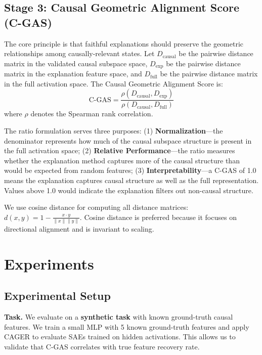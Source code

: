 \documentclass{article}
\begin{document}
\subsection{Stage 3: Causal Geometric Alignment Score (C-GAS)}

The core principle is that faithful explanations should preserve the geometric relationships among causally-relevant states. Let $D_{\text{causal}}$ be the pairwise distance matrix in the validated causal subspace space, $D_{\text{exp}}$ be the pairwise distance matrix in the explanation feature space, and $D_{\text{full}}$ be the pairwise distance matrix in the full activation space. The Causal Geometric Alignment Score is:
\begin{equation}
\text{C-GAS} = \frac{\rho(D_{\text{causal}}, D_{\text{exp}})}{\rho(D_{\text{causal}}, D_{\text{full}})}
\end{equation}
where $\rho$ denotes the Spearman rank correlation.

The ratio formulation serves three purposes: (1) \textbf{Normalization}---the denominator represents how much of the causal subspace structure is present in the full activation space; (2) \textbf{Relative Performance}---the ratio measures whether the explanation method captures more of the causal structure than would be expected from random features; (3) \textbf{Interpretability}---a C-GAS of 1.0 means the explanation captures causal structure as well as the full representation. Values above 1.0 would indicate the explanation filters out non-causal structure.

We use cosine distance for computing all distance matrices: $d(x, y) = 1 - \frac{x \cdot y}{\|x\| \|y\|}$. Cosine distance is preferred because it focuses on directional alignment and is invariant to scaling.

\section{Experiments}

\subsection{Experimental Setup}

\textbf{Task.} We evaluate on a \textbf{synthetic task} with known ground-truth causal features. We train a small MLP with 5 known ground-truth features and apply CAGER to evaluate SAEs trained on hidden activations. This allows us to validate that C-GAS correlates with true feature recovery rate.
\end{document}
